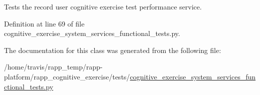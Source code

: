 Tests the record user cognitive exercise test performance service. 



Definition at line 69 of file cognitive\-\_\-exercise\-\_\-system\-\_\-services\-\_\-functional\-\_\-tests.\-py.



The documentation for this class was generated from the following file\-:\begin{DoxyCompactItemize}
\item 
/home/travis/rapp\-\_\-temp/rapp-\/platform/rapp\-\_\-cognitive\-\_\-exercise/tests/\hyperlink{cognitive__exercise__system__services__functional__tests_8py}{cognitive\-\_\-exercise\-\_\-system\-\_\-services\-\_\-functional\-\_\-tests.\-py}\end{DoxyCompactItemize}
